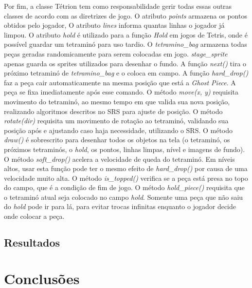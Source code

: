 \documentclass[
	12pt,				%
	openright,			%
	oneside,			%
	a4paper,			%
	brazil,				%
	]{abntex2}
\begin{document}
Por fim, a classe Tétrion tem como responsabilidade gerir todas essas outras classes de acordo com as diretrizes de jogo. O atributo \textit{points} armazena os pontos obtidos pelo jogador, O atributo \textit{lines} informa quantas linhas o jogador já limpou. O atributo \textit{hold} é utilizado para a função \textit{Hold} em jogos de Tetris, onde é possível guardar um tetraminó para uso tardio. O \textit{tetramino\_bag} armazena todas peças geradas randomicamente para serem colocadas em jogo. \textit{stage\_sprite} apenas guarda os sprites utilizados para desenhar o fundo. A função \textit{next()} tira o próximo tetraminó de \textit{tetramino\_bag} e o coloca em campo. A função \textit{hard\_drop()} faz a peça cair automaticamente na mesma posição que está a \textit{Ghost Piece}. A peça se fixa imediatamente após esse comando. O método \textit{move(x, y)} requisita movimento do tetraminó, ao mesmo tempo em que valida sua nova posição, realizando algoritmos descritos no SRS para ajuste de posição. O método \textit{rotate(dir)} requisita um movimento de rotação ao tetraminó, validando sua posição após e ajustando caso haja necessidade, utilizando o SRS. O método \textit{draw()} é sobrescrito para desenhar todos os objetos na tela (o tetraminó, os próximos tetraminós, o \textit{hold}, os pontos, linhas limpas, nível e imagens de fundo). O método \textit{soft\_drop()} acelera a velocidade de queda do tetraminó. Em níveis altos, usar esta função pode ter o mesmo efeito de \textit{hard\_drop()} por causa de uma velocidade muito alta. O método \textit{is\_topped()} verifica se a peça está presa no topo do campo, que é a condição de fim de jogo. O método \textit{hold\_piece()} requisita que o tetraminó atual seja colocado no campo \textit{hold}. Somente uma peça que não saiu do \textit{hold} pode ir para lá, para evitar trocas infinitas enquanto o jogador decide onde colocar a peça.

\section{Resultados}

\chapter{Conclusões} 

\postextual
 
 

\end{document}
